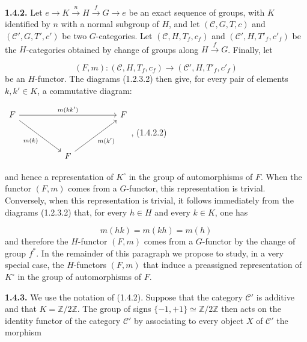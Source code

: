 %
\noindent\textbf{1.4.2.}\quad
Let $e\to K\xrightarrow{n}H\xrightarrow{f}G\to e$ be an exact
sequence of groups, with $K$ identified by $n$ with a normal subgroup
of $H$, and let $(\mathcal C,G,T,c)$ and
$(\mathcal C',G,T',c')$ be two $G$-categories. Let
$(\mathcal C,H,T_f,c_f)$ and $(\mathcal C',H,T'_f,c'_f)$ be the
$H$-categories obtained by change of groups along
$H\xrightarrow{f}G$. Finally, let

\begin{equation}
  (F,m)\colon(\mathcal C,H,T_f,c_f)
  \longrightarrow(\mathcal C',H,T'_f,c'_f)
  \tag{1.4.2.1}
\end{equation}
be an $H$-functor. The diagrams (1.2.3.2) then give, for every pair of
elements $k,k'\in K$, a commutative diagram:

\begin{center}
  $\begin{tikzcd}[ampersand replacement=\&,column sep=5em,row sep=3.5em]
    F \arrow[rr,"{m(kk')}"] \arrow[dr,"{m(k)}"']
      \& \& F \\
      \& F \arrow[ur,"{m(k')}"'] \&
  \end{tikzcd}$,
  \hfill\textup{(1.4.2.2)}
\end{center}

and hence a representation of $K^\circ$ in the group of automorphisms
of $F$. When the functor $(F,m)$ comes from a $G$-functor, this
representation is trivial. Conversely, when this representation is
trivial, it follows immediately from the diagrams (1.2.3.2) that, for
every $h\in H$ and every $k\in K$, one has

\begin{equation}
  m(hk)=m(kh)=m(h)
  \tag{1.4.2.3}
\end{equation}
and therefore the $H$-functor $(F,m)$ comes from a $G$-functor by the
change of group $f^*$. In the remainder of this paragraph we propose to
study, in a very special case, the $H$-functors $(F,m)$ that induce a
preassigned representation of $K^\circ$ in the group of automorphisms
of $F$.

\noindent\textbf{1.4.3.}\quad
We use the notation of (1.4.2). Suppose that the category $\mathcal C'$
is additive and that $K=\mathbb Z/2\mathbb Z$. The group of signs
$\{-1,+1\}\simeq\mathbb Z/2\mathbb Z$ then acts on the identity
functor of the category $\mathcal C'$ by associating to every object
$X$ of $\mathcal C'$ the morphism

